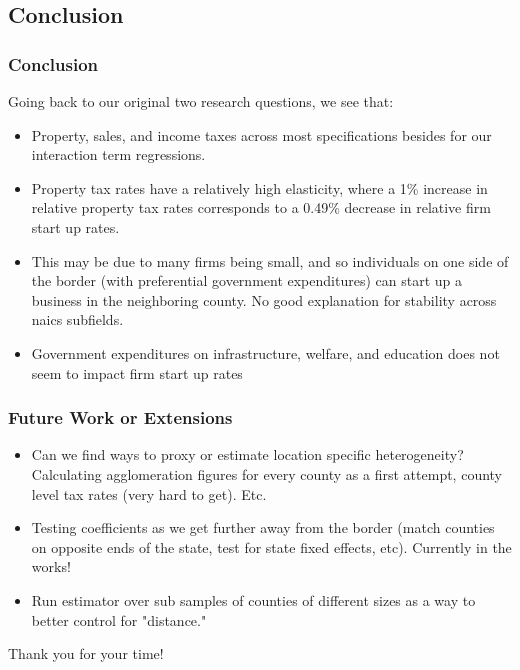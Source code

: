 \documentclass{beamer}
\begin{document}
\begin{frame}
\section{Conclusion}
\frametitle{Conclusion}
Going back to our original two research questions, we see that:
\begin{itemize}
\item Property, sales, and income taxes across most specifications besides for our interaction term regressions. 
\item Property tax rates have a relatively high elasticity, where a 1\% increase in relative property tax rates corresponds to a 0.49\% decrease in relative firm start up rates.
\item This may be due to many firms being small, and so individuals on one side of the border (with preferential government expenditures) can start up a business in the neighboring county. No good explanation for stability across naics subfields.
\item Government expenditures on infrastructure, welfare, and education does not seem to impact firm start up rates

\end{itemize}
\end{frame}

\begin{frame}
\frametitle{Future Work or Extensions}
\begin{itemize}
\item Can we find ways to proxy or estimate location specific heterogeneity? Calculating agglomeration figures for every county as a first attempt, county level tax rates (very hard to get). Etc.
\item Testing coefficients as we get further away from the border (match counties on opposite ends of the state, test for state fixed effects, etc). Currently in the works!
\item Run estimator over sub samples of counties of different sizes as a way to better control for "distance."
\end{itemize}
\end{frame}

\begin{frame}
\begin{centering}
\huge{Thank you for your time!}
\end{centering}
\end{frame}
\end{document}
